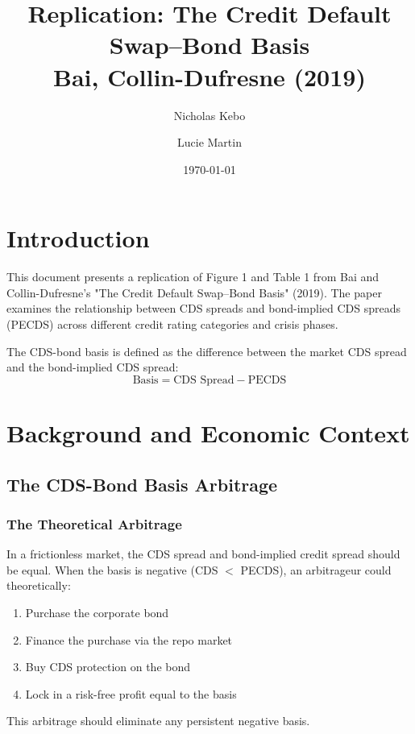\documentclass{article}
\title{Replication: The Credit Default Swap–Bond Basis \\
\large Bai, Collin-Dufresne (2019)}
\author{Nicholas Kebo \and Lucie Martin}
\date{\today}
\begin{document}
\maketitle

\section{Introduction}

This document presents a replication of Figure 1 and Table 1 from Bai and Collin-Dufresne's "The Credit Default Swap–Bond Basis" (2019).
The paper examines the relationship between CDS spreads and bond-implied CDS spreads (PECDS) across different credit rating categories and crisis phases.

The CDS-bond basis is defined as the difference between the market CDS spread and the bond-implied CDS spread:
\begin{equation}
    \text{Basis} = \text{CDS Spread} - \text{PECDS}
\end{equation}

\section{Background and Economic Context}

\subsection{The CDS-Bond Basis Arbitrage}

\subsubsection{The Theoretical Arbitrage}
In a frictionless market, the CDS spread and bond-implied credit spread should be equal. When the basis is negative (CDS $<$ PECDS), an arbitrageur could theoretically:
\begin{enumerate}
    \item Purchase the corporate bond
    \item Finance the purchase via the repo market
    \item Buy CDS protection on the bond
    \item Lock in a risk-free profit equal to the basis
\end{enumerate}
This arbitrage should eliminate any persistent negative basis.
\end{document}
